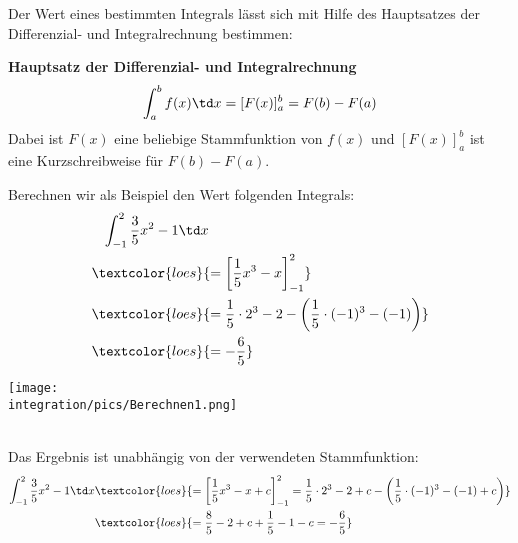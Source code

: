 Der Wert eines bestimmten Integrals lässt sich mit Hilfe des Hauptsatzes der Differenzial- und Integralrechnung bestimmen:
\begin{tcolorbox}
	\textbf{Hauptsatz der Differenzial- und Integralrechnung}
	\textcolor{loestc}{\[\int_a^b f(x)\td x=[F(x)]_a^b=F(b)-F(a)\]}
	\textcolor{loestc}{Dabei ist \(F(x)\) eine beliebige Stammfunktion von \(f(x)\) und\newline
		\([F(x)]_a^b\) ist eine Kurzschreibweise für \(F(b)-F(a)\).}
\end{tcolorbox}
\begin{minipage}{\textwidth}
	\begin{minipage}{.59\textwidth}\raggedright
		Berechnen wir als Beispiel den Wert folgenden Integrals:
		\begin{align*}
			&\phantom{=}\int_{-1}^2 \frac{3}{5}x^2-1\td x\\		
			&\textcolor{loes}{=\left[\frac{1}{5}x^3-x\right]_{-1}^2}\\
			&\textcolor{loes}{=\frac{1}{5}\cdot 2^3-2-\left(\frac{1}{5}\cdot (-1)^3-(-1)\right)}\\
			&\textcolor{loes}{=-\frac{6}{5}}\\
		\end{align*}		
	\end{minipage}
	\begin{minipage}{.36\textwidth}
		\texttt{[image: \\integration/pics/Berechnen1.png]}
	\end{minipage}
\end{minipage}\vspace{\baselineskip}\\
Das Ergebnis ist unabhängig von der verwendeten Stammfunktion:
\begin{align*}
	\int_{-1}^2 \frac{3}{5}x^2-1\td x&\textcolor{loes}{=\left[\frac{1}{5}x^3-x+c\right]_{-1}^2=\frac{1}{5}\cdot 2^3-2+c-\left(\frac{1}{5}\cdot (-1)^3-(-1)+c\right)}\\
	&\textcolor{loes}{=\frac{8}{5}-2+c+\frac{1}{5}-1-c=-\frac{6}{5}}
\end{align*}

